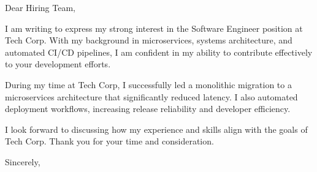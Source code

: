 Dear Hiring Team,

I am writing to express my strong interest in the Software Engineer position at Tech Corp. With my background in microservices, systems architecture, and automated CI/CD pipelines, I am confident in my ability to contribute effectively to your development efforts.

During my time at Tech Corp, I successfully led a monolithic migration to a microservices architecture that significantly reduced latency. I also automated deployment workflows, increasing release reliability and developer efficiency.

I look forward to discussing how my experience and skills align with the goals of Tech Corp. Thank you for your time and consideration.

Sincerely,